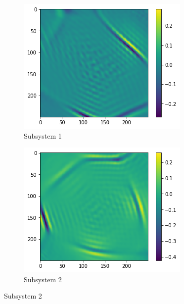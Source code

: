 \documentclass[12pt,a4paper]{article}
\begin{document}
\begin{figure}[!h]
        \captionsetup[subfigure]{labelformat=empty}
        \centering
        \begin{subfigure}{0.4\linewidth}
                \includegraphics[width=\linewidth]{Neutral_ChargedEP_1}
                \caption{Subsystem 1}
        \end{subfigure}
        \begin{subfigure}{0.4\linewidth}
                \includegraphics[width=\linewidth]{Neutral_ChargedEP_2}
                \caption{Subsystem 2}
        \end{subfigure}

\end{figure}
\end{document}
